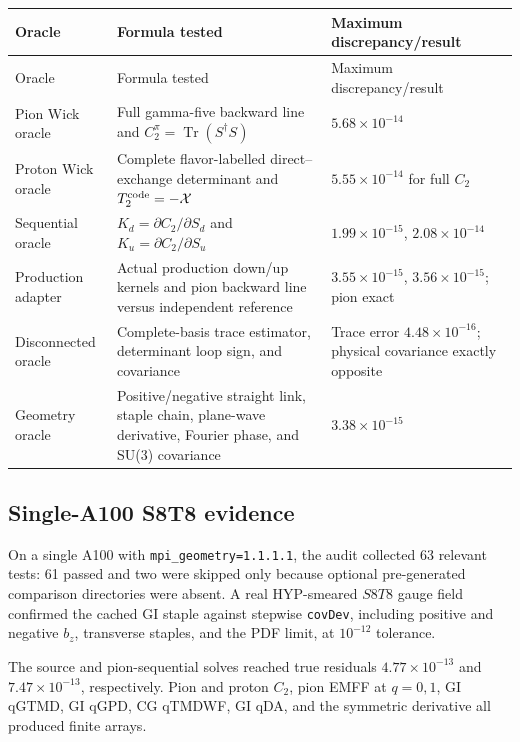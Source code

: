 \documentclass[11pt,a4paper]{article}
\numberwithin{equation}{section}
\newcommand{\Tr}{\operatorname{Tr}}
\newcommand{\code}[1]{%
  \ifmmode\text{\texttt{\detokenize{#1}}}\else\nolinkurl{#1}\fi}
\begin{document}
\begin{longtable}{L{0.24\textwidth}L{0.48\textwidth}L{0.20\textwidth}}
\toprule
Oracle & Formula tested & Maximum discrepancy/result\\
\midrule
\endfirsthead
\toprule
Oracle & Formula tested & Maximum discrepancy/result\\
\midrule
\endhead
Pion Wick oracle &
Full gamma-five backward line and
\(C_2^\pi=\Tr(S^\dagger S)\) &
\(5.68\times10^{-14}\)\\
Proton Wick oracle &
Complete flavor-labelled direct--exchange determinant and
\(T_2^{\rm code}=-\mathcal X\) &
\(5.55\times10^{-14}\) for full \(C_2\)\\
Sequential oracle &
\(K_d=\partial C_2/\partial S_d\) and
\(K_u=\partial C_2/\partial S_u\) &
\(1.99\times10^{-15}\), \(2.08\times10^{-14}\)\\
Production adapter &
Actual production down/up kernels and pion backward line versus independent
reference &
\(3.55\times10^{-15}\), \(3.56\times10^{-15}\); pion exact\\
Disconnected oracle &
Complete-basis trace estimator, determinant loop sign, and covariance &
Trace error \(4.48\times10^{-16}\); physical covariance exactly opposite\\
Geometry oracle &
Positive/negative straight link, staple chain, plane-wave derivative,
Fourier phase, and SU(3) covariance &
\(3.38\times10^{-15}\)\\
\bottomrule
\end{longtable}

\subsection{Single-A100 S8T8 evidence}

On a single A100 with \code{mpi_geometry=1.1.1.1}, the audit collected 63
relevant tests: 61 passed and two were skipped only because optional
pre-generated comparison directories were absent.  A real HYP-smeared
\(S8T8\) gauge field confirmed the cached GI staple against stepwise
\code{covDev}, including positive and negative \(b_z\), transverse staples,
and the PDF limit, at \(10^{-12}\) tolerance.

The source and pion-sequential solves reached true residuals
\(4.77\times10^{-13}\) and \(7.47\times10^{-13}\), respectively.  Pion and
proton \(C_2\), pion EMFF at \(q=0,1\), GI qGTMD, GI qGPD, CG qTMDWF, GI qDA,
and the symmetric derivative all produced finite arrays.
\end{document}
